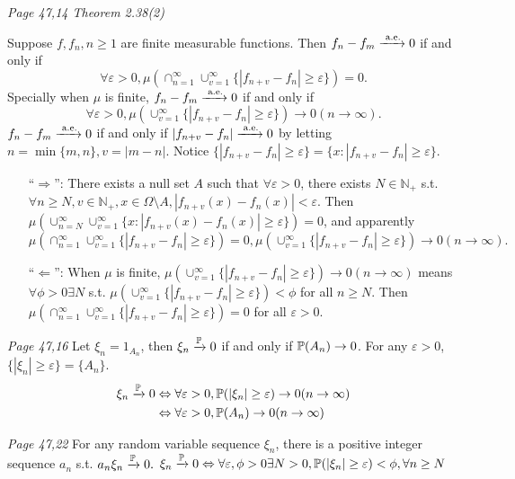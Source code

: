 \begin{enumerate}
\prob
\textit{Page 47,14 Theorem 2.38(2) }%

Suppose $f,f_n,n\geq 1$ are finite measurable functions. Then $f_n-f_m\xrightarrow{\textrm{ a.e.}} 0$ if and only if $$
\forall \varepsilon >0,\mu(\cap^\infty_{n=1}\cup^\infty_{v=1}\{|f_{n+v}-f_n |\geq \varepsilon\})=0. $$
Specially when $\mu$ is finite, $f_n-f_m\xrightarrow{\textrm{ a.e.}} 0$ if and only if $$
\forall \varepsilon >0,\mu(\cup^\infty_{v=1}\{|f_{n+v}-f_n |\geq \varepsilon\})\to 0(n\to\infty). $$
\soln 
$f_n-f_m\xrightarrow{\textrm{ a.e.}} 0$ if and only if $|f_{n+v}-f_n|\xrightarrow{\textrm{ a.e.}} 0$ by letting $n=\min\{m,n\}, v=|m-n|$. Notice 
$\{|f_{n+v}-f_n |\geq \varepsilon\}=\{x: |f_{n+v}-f_n |\geq \varepsilon\}$.
\begin{itemize}
	\item[``$\Rightarrow$'':] 
	There exists a null set $A$ such that $\forall \varepsilon >0$, there exists $N\in \mathbb{N}_+$ s.t. $\forall n\geq N, v\in  \mathbb{N}_+, x\in \Omega\setminus A, |f_{n+v}(x)-f_n(x) |<\varepsilon$.
	Then $\mu(\cup^\infty_{n=N}\cup^\infty_{v=1}\{x: |f_{n+v}(x)-f_n(x) |\geq \varepsilon\})=0$, and apparently $$
	\mu(\cap^\infty_{n=1}\cup^\infty_{v=1}\{|f_{n+v}-f_n |\geq \varepsilon\})= 0,
	 \mu(\cup^\infty_{v=1}\{|f_{n+v}-f_n |\geq \varepsilon\})\to 0(n\to\infty).$$
	\item[``$\Leftarrow$'':] 
	When $\mu$ is finite, $\mu(\cup^\infty_{v=1}\{|f_{n+v}-f_n |\geq \varepsilon\})\to 0(n\to\infty)$ means $\forall \phi>0 \exists N$ s.t. $\mu(\cup^\infty_{v=1}\{|f_{n+v}-f_n |\geq \varepsilon\})< \phi$ for all $n\geq N$.
	Then $\mu(\cap^\infty_{n=1}\cup^\infty_{v=1}\{|f_{n+v}-f_n |\geq \varepsilon\})=0$ for all $\varepsilon >0$. 
\vspace{2em}
\end{itemize}


\prob\textit{Page 47,16}
Let $\xi_n=1_{A_n}$, then $\xi_n \xrightarrow{\mathbb{P}} 0$ if and only if $\mathbb{P}(A_n)\to 0$.
\soln For any $\varepsilon > 0$, $\{|\xi_n|\geq\varepsilon\}=\{A_n\}$.
\begin{align*}
	\xi_n \xrightarrow{\mathbb{P}} 0 &\Leftrightarrow \forall \varepsilon >0,\mathbb{P}(|\xi_n|\geq\varepsilon)\to 0(n\to \infty) \\
	&\Leftrightarrow \forall \varepsilon >0,\mathbb{P}(A_n)\to 0(n\to \infty) 
\end{align*}

\prob\textit{Page 47,22}
For any random variable sequence $\xi_n$, there is a positive integer sequence $a_n$ s.t. $a_n \xi_n \xrightarrow{\mathbb{P}} 0.$
\soln $\xi_n \xrightarrow{\mathbb{P}} 0 \Leftrightarrow \forall \varepsilon,\phi >0\exists N>0, \mathbb{P}(|\xi_n|\geq\varepsilon)< \phi, \forall n\geq N$
\vspace{3em}


\end{enumerate}
